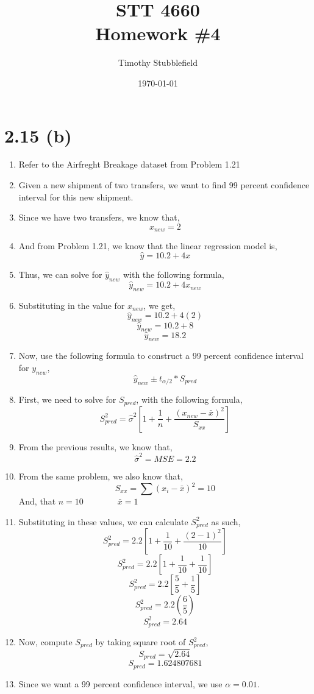 \documentclass{article}
\title{STT 4660 \\ Homework \#4}
\author{Timothy Stubblefield}
\date{\today}
\begin{document}
	
\maketitle

\section*{2.15 (b)}
	\begin{enumerate}[label = \arabic*)]
		\item Refer to the Airfreght Breakage dataset from Problem 1.21
		\item Given a new shipment of two transfers, we want to find 99 percent confidence interval for this new shipment.
		\item Since we have two transfers, we know that,
		\[x_{new} = 2\]
		\item And from Problem 1.21, we know that the linear regression model is,
		\[\hat{y} = 10.2 +4x\]
		\item Thus, we can solve for $\hat{y}_{new}$ with the following formula,
		\[\hat{y}_{new} = 10.2 + 4x_{new}\]
		\item Substituting in the value for $x_{new}$, we get,
		\[\hat{y}_{new} = 10.2 + 4(2)\]
		\[\hat{y}_{new} = 10.2 + 8\]
		\[\hat{y}_{new} = 18.2\]
		\item Now, use the following formula to construct a 99 percent confidence interval for $y_{new}$,
		\[\hat{y}_{new} \pm t_{\alpha/2} * S_{pred}\] 
		\item First, we need to solve for $S_{pred}$, with the following formula,
		\[S_{pred}^2 = \hat{\sigma}^2[1 + \frac{1}{n} + \frac{(x_{new}-\bar{x})^2}{S_{xx}}]\]
		\item From the previous results, we know that,
		\[\hat{\sigma}^2 = MSE = 2.2\]
		\item From the same problem, we also know that,
		\[S_{xx} = \sum(x_i - \bar{x})^2 = 10\]
		And, that $n = 10 \qquad \qquad \bar{x} = 1$
		\item Substituting in these values, we can calculate $S_{pred}^2$ as such,
		\[S_{pred}^2 = 2.2[1+ \frac{1}{10} + \frac{(2-1)^2}{10}]\]
		\[S_{pred}^2 = 2.2[1 + \frac{1}{10} + \frac{1}{10}]\]
		\[S_{pred}^2 = 2.2[\frac{5}{5} + \frac{1}{5}]\]
		\[S_{pred}^2 = 2.2(\frac{6}{5})\]
		\[S_{pred}^2 = 2.64\]
		\item Now, compute $S_{pred}$ by taking square root of $S_{pred}^2$,
		\[S_{pred} = \sqrt{2.64}\]
		\[S_{pred} = 1.624807681\]
		\item Since we want a 99 percent confidence interval, we use $\alpha = 0.01$.

\end{enumerate}
\end{document}
